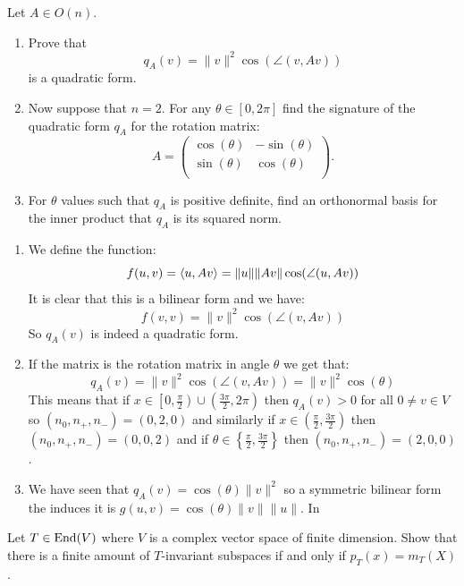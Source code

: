 \documentclass[11pt, a4paper]{article}
\begin{document}
\begin{exercise}
  Let $A \in O(n)$.
  \begin{enumerate}
    \item[(1)] Prove that
      \[
        q_A(v) = \|v\|^2\cos(\angle(v,Av))
      \]
      is a quadratic form.
    \item[(2)] Now suppose that $n=2$. For any $\theta\in[0,2\pi]$ find the
      signature of the quadratic form $q_A$ for the rotation matrix:
      \[
        A = \begin{pmatrix}
          \cos(\theta) & -\sin(\theta)\\
          \sin(\theta) &  \cos(\theta)\\
        \end{pmatrix}.
      \]
    \item[(3)] For $\theta$ values such that $q_A$ is positive definite,
      find an orthonormal basis for the inner product that $q_A$ is its
      squared norm.
  \end{enumerate}
\end{exercise}
\begin{solution} \phantom{}
\begin{enumerate}
  \item[(1)]
  We define the function:
  \[
    f(u,v) = \left\langle u, Av \right\rangle = \|u\|\|Av\|\cos(\angle(u,Av))
  \]
  It is clear that this is a bilinear form and we have:
  \[
    f(v,v) = \|v\|^2\cos(\angle(v,Av))
  \]
  So $q_A(v)$ is indeed a quadratic form.

\item[(2)]
  If the matrix is the rotation matrix in angle $\theta$ we get that:
  \[
    q_A(v) = \|v\|^2\cos(\angle(v,Av)) = \|v\|^2\cos(\theta)
  \]
  This means that if 
  $x\in\left[0,\frac{\pi}{2}\right) \cup \left(\frac{3\pi}{2},2\pi\right)$
  then $q_A(v) > 0$ for all $0 \neq v \in V$ so $(n_0,n_+,n_-) = (0,2,0)$ and
  similarly if $x \in \left(\frac{\pi}{2},\frac{3\pi}{2}\right)$ then 
  $(n_0,n_+,n_-) = (0,0,2)$ and if 
  $\theta \in \left\{\frac{\pi}{2},\frac{3\pi}{2}\right\}$ then 
  $(n_0,n_+,n_-) = (2,0,0)$.

\item[(3)]
  We have seen that $q_A(v) = \cos(\theta)\|v\|^2$ so a symmetric bilinear form
  the induces it is $g(u,v) = \cos(\theta)\|v\|\|u\|$. In 
\end{enumerate}
\end{solution}

\begin{exercise}
  Let $T \in \operatorname{End}(V)$ where $V$ is a complex vector space of finite dimension.
  Show that there is a finite amount of $T$-invariant subspaces if and only if
  $p_T(x) = m_T(X)$.
\end{exercise}

	
\end{document}
